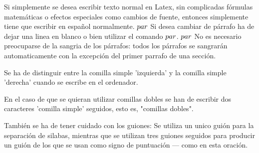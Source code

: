\documentclass[a4paper,10pt]{letter}
\begin{document}
Si simplemente se desea escribir texto normal en Latex,
sin complicadas f\'ormulas matem\'aticas o efectos especiales
como cambios de fuente, entonces simplemente tiene que escribir
en espa\~nol normalmente.
$\\par$
Si desea cambiar de párrafo ha de dejar una linea en blanco o bien
utilizar el comando $\\par$.
$\\par$
No es necesario preocuparse de la sangria de los párrafos:
todos los párrafos se sangrarán automaticamente con la excepción 
del primer parrafo de una sección.

Se ha de distinguir entre la comilla simple 'izquierda'
y la comilla simple 'derecha' cuando se escribe en el ordenador.

En el caso de que se quieran utilizar comillas dobles se han de 
escribir dos caracteres 'comilla simple' seguidos, esto es,
"comillas dobles".

También se ha de tener cuidado con los guiones: Se utiliza un unico
guión para la separación de silabas, mientras que se utilizan 
tres guiones seguidos para producir un guión de los que se usan
como signo de puntuación --- como en esta oración.
\end{document}
